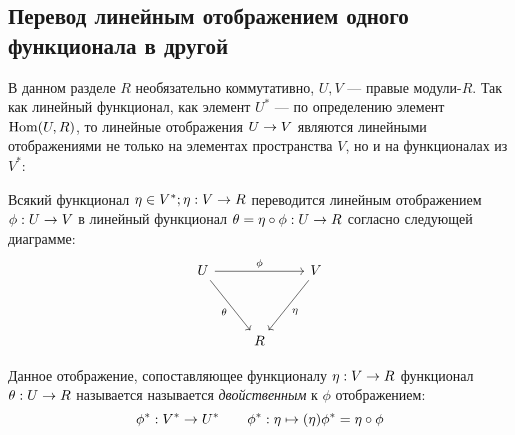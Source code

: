 \documentclass[a4paper]{report}
\begin{document}
    \subsection{Перевод линейным отображением одного функционала в другой}
    В данном разделе $R$ необязательно коммутативно, $U, V$ --- правые модули-$R$.
    Так как линейный функционал, как элемент $U^*$ --- по определению элемент $\operatorname{Hom}(U, R)$, то линейные отображения $U \rightarrow V$ являются линейными отображениями не только на элементах пространства $V$, но и на функционалах из $V^*$:

    Всякий функционал $\eta \in V^*; \eta: V \rightarrow R$ переводится линейным отображением $\phi: U \rightarrow V$ в линейный функционал $\theta = \eta \circ \phi: U \rightarrow R$ согласно следующей диаграмме:
    \[\begin{tikzcd}[ampersand replacement=\&]
    { U} \&\& { V} \\
    \\
    \& { R}
    \arrow["\phi", from=1-1, to=1-3]
    \arrow["\eta", from=1-3, to=3-2]
    \arrow["\theta"', from=1-1, to=3-2]
    \end{tikzcd}\]

    Данное отображение, сопоставляющее функционалу $\eta: V \rightarrow R$ функционал $\theta: U \rightarrow R$ называется называется \emph{двойственным} к $\phi$ отображением:
    \[\phi^*: V^* \rightarrow U^* \qquad \phi^*: \eta \mapsto (\eta)\phi^* = \eta \circ \phi\]
\end{document}
